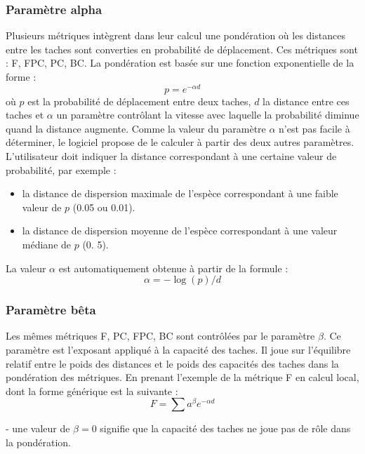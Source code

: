 \documentclass{article}
\begin{document}
\subsubsection{Paramètre alpha}
\label{metric_alpha}
Plusieurs métriques intègrent dans leur calcul une pondération où les distances entre les taches sont converties en probabilité de déplacement. Ces métriques sont : F, FPC, PC, BC. La pondération est basée sur une fonction exponentielle de la forme :
\begin{equation*}
p={e}^{-\mathit{\alpha d}}
\end{equation*}
où $p$ est la probabilité de déplacement entre deux taches, $d$ la distance entre ces taches et $\alpha$ un paramètre contrôlant la vitesse avec laquelle la probabilité diminue quand la distance augmente. Comme la valeur du paramètre $\alpha$ n’est pas facile à déterminer, le logiciel propose de le calculer à partir des deux autres paramètres. L’utilisateur doit indiquer la distance correspondant à une certaine valeur de probabilité, par exemple :
\begin{itemize}
	\item la distance de dispersion maximale de l’espèce correspondant à une faible valeur de $p$ (0.05 ou 0.01).
	\item la distance de dispersion moyenne de l’espèce correspondant à une valeur médiane de $p$ (0. 5).
\end{itemize}
La valeur $\alpha $ est automatiquement obtenue à partir de la formule :
\begin{equation*}
\alpha =-\log \left(p\right)/{d}
\end{equation*}


\subsubsection{Paramètre bêta}

Les mêmes métriques F, PC, FPC, BC sont contrôlées par le paramètre $\beta$. Ce paramètre est l’exposant appliqué à la capacité des taches. Il joue sur l’équilibre relatif entre le poids des distances et le poids des capacités des taches dans la pondération des métriques. En prenant l’exemple de la métrique F en calcul local, dont la forme générique est la suivante :
\begin{equation*}
F=\sum {{a}^{\beta }}{e}^{-\mathit{\alpha d}}
\end{equation*}

{}- une valeur de  $\beta =0$ signifie que la capacité des taches ne joue pas de rôle dans la pondération.
\end{document}

